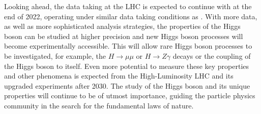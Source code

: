 Looking ahead, the data taking at the LHC is expected to continue with \RunThr at the end of 2022, operating under similar data taking conditions as \RunTwo. 
With more data, as well as more sophisticated analysis strategies, the properties of the Higgs boson can be studied at higher precision and new Higgs boson processes will become experimentally accessible. 
This will allow rare Higgs boson processes to be investigated, for example, the $H \to \mu\mu$ or $H \to Z\gamma$ decays or the coupling of the Higgs boson to itself.
Even more potential to measure these key properties and other phenomena is expected from the High-Luminosity LHC and its upgraded experiments after 2030.
The study of the Higgs boson and its unique properties will continue to be of utmost importance, guiding the particle physics community in the search for the fundamental laws of nature. 

